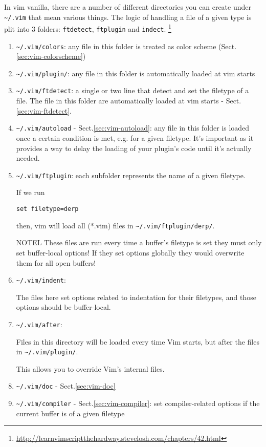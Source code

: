 In vim vanilla, there are a number of different directories you can create under
\verb!~/.vim! that mean various things. The logic of handling a file of a given
type is plit into 3 folders:
\verb!ftdetect!, \verb!ftplugin! and \verb!indect!.
\footnote{\url{http://learnvimscriptthehardway.stevelosh.com/chapters/42.html}}

\begin{enumerate}
  \item \verb!~/.vim/colors!: any file in this folder is treated as color scheme
  (Sect.\ref{sec:vim-colorscheme})
  
  \item \verb!~/.vim/plugin/!: any file in this folder is automatically loaded
  at vim starts
  
  \item \verb!~/.vim/ftdetect!: a single or two line that detect and set the
  filetype of a file. The file in this folder are automatically loaded
  at vim starts - Sect.\ref{sec:vim-ftdetect}.
    
  \item \verb!~/.vim/autoload!  - Sect.\ref{sec:vim-autoload}: 
  any file in this folder is loaded once a certain condition is met, e.g. for
  a given filetype. 
  It's important as it provides a way to delay the loading of your plugin's code
  until it's actually needed.
  
  \item \verb!~/.vim/ftplugin!: each subfolder represents the name of a given
  filetype.
  
If we run
\begin{verbatim}
set filetype=derp
\end{verbatim}  
then, vim will load all (*.vim) files in \verb!~/.vim/ftplugin/derp/!.
  
NOTEL These files are run every time a buffer's filetype is set they must only
set buffer-local options! If they set options globally they would overwrite them for
all open buffers!
  
  \item \verb!~/.vim/indent!:
  
The files here set options related to indentation for their filetypes, and those
options should be buffer-local.
   
  \item \verb!~/.vim/after!: 
  
  Files in this directory will be loaded every time Vim starts, but after the
  files in \verb!~/.vim/plugin/!.
  
  This allows you to override Vim's internal files. 
  
  \item \verb!~/.vim/doc! - Sect.\ref{sec:vim-doc}
  
  \item \verb!~/.vim/compiler! - Sect.\ref{sec:vim-compiler}: set
  compiler-related options if the current buffer is of a given filetype
  
  
\end{enumerate}


